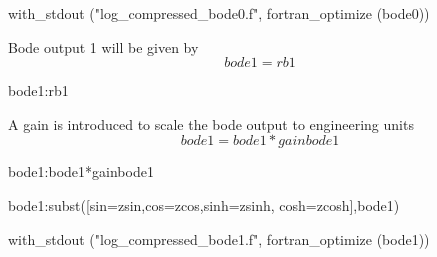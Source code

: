\documentclass[12pt]{article}
\begin{document}
\begin{maxima-noout}
	with_stdout ("log_compressed_bode0.f", fortran_optimize (bode0))
\end{maxima-noout}
Bode output 1 will be given by
\begin{equation}
	bode1=rb1
\end{equation}
\begin{maxima-noout}
bode1:rb1
\end{maxima-noout}
A gain is introduced to scale the bode output to engineering units
\begin{equation}
	bode1=bode1*gainbode1
\end{equation}
\begin{maxima-noout}
	bode1:bode1*gainbode1
\end{maxima-noout}
\begin{maxima-noout}
	bode1:subst([sin=zsin,cos=zcos,sinh=zsinh, cosh=zcosh],bode1)
\end{maxima-noout}
\begin{maxima-noout}
	with_stdout ("log_compressed_bode1.f", fortran_optimize (bode1))
\end{maxima-noout}
\end{document}
